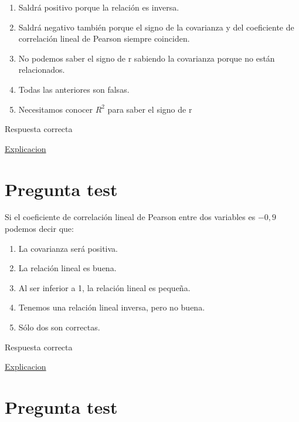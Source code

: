 \documentclass[
]{book}
\providecommand{\tightlist}{%
  \setlength{\itemsep}{0pt}\setlength{\parskip}{0pt}}
\begin{document}
\begin{enumerate}
\def\labelenumi{\alph{enumi})}
\tightlist
\item
  Saldrá positivo porque la relación es inversa.
\item
  Saldrá negativo también porque el signo de la covarianza y del coeficiente de correlación lineal de Pearson siempre coinciden.
\item
  No podemos saber el signo de r sabiendo la covarianza porque no están relacionados.
\item
  Todas las anteriores son falsas.
\item
  Necesitamos conocer \(R^2\) para saber el signo de r
\end{enumerate}

Respuesta correcta

\href{https://1fjmanzano.github.io/bioestadistica/relaci\%C3\%B3n-entre-variables-nume\%CC\%81ricas.html\#covarianza}{Explicacion}

\hypertarget{pregunta-test-139}{%
\section{Pregunta test}\label{pregunta-test-139}}

Si el coeficiente de correlación lineal de Pearson entre dos variables es \(-0,9\) podemos decir que:

\begin{enumerate}
\def\labelenumi{\alph{enumi})}
\tightlist
\item
  La covarianza será positiva.
\item
  La relación lineal es buena.
\item
  Al ser inferior a 1, la relación lineal es pequeña.
\item
  Tenemos una relación lineal inversa, pero no buena.
\item
  Sólo dos son correctas.
\end{enumerate}

Respuesta correcta

\href{https://1fjmanzano.github.io/bioestadistica/relaci\%C3\%B3n-entre-variables-nume\%CC\%81ricas.html\#coeficiente-de-correlacio\%CC\%81n}{Explicacion}

\hypertarget{pregunta-test-140}{%
\section{Pregunta test}\label{pregunta-test-140}}
\end{document}
